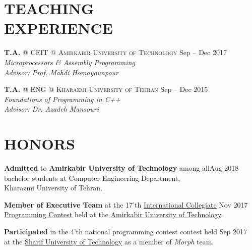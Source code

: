 \documentclass[margin, 10pt]{res} %
\begin{document}
\begin{resume}
    
    \section{TEACHING \\ EXPERIENCE} 
    
   \textbf{T.A.} \textsc{@}
   \textsc{CEIT} \textsc{@} \textsc{Amirkabir University of Technology}
   \hfill {Sep -- Dec 2017}\\
   \textit{Microprocessors \& Assembly Programming}\\
   \textit{Advisor: Prof. Mahdi Homayounpour}
   \href{https://github.com/aligholamee/Microprocessors}{\hfill\UrlFont[Resources]}
   
   \textbf{T.A.} \textsc{@}
   \textsc{ENG} \textsc{@} \textsc{Kharazmi University of Tehran}
   \hfill {Sep -- Dec 2015}\\
   \textit{Foundations of Programming in C++}\\
   \textit{Advisor: Dr. Azadeh Mansouri}
   \href{https://github.com/aligholamee/Foundations-of-Programming}{\hfill\UrlFont[Resources]}

	\section{HONORS}
	\textbf{Admitted} to 
	\textbf{Amirkabir University of Technology}
	among all\hfill {Aug 2018}\\ bachelor students at Computer Engineering 
	Department,\\ Kharazmi University of Tehran.
	
	\textbf{Member of Executive Team}
	at the 17'th \href{https://icpc.baylor.edu/regionals/finder/tehran-2017}{International Collegiate} \hfill {Nov 2017}\\  \href{https://icpc.baylor.edu/regionals/finder/tehran-2017}{Programming Contest} held at the \href{http://ceit.aut.ac.ir}{Amirkabir University of Technology}.
	
	\textbf{Participated}
	in the 4'th national programming contest contest held \hfill {Sep 2017}\\at the \href{http://sharif.ir}{Sharif University of Technology} as a member of \textit{Morph} team.


\end{resume}
\end{document}
